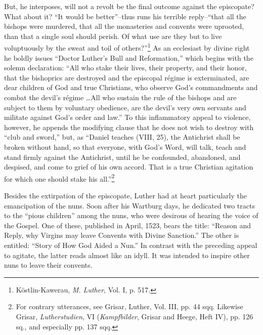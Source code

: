 But, he interposes, will not a revolt be the final outcome
against the episcopate? What about it? “It would be better”--thus runs his
terrible reply--“that all the bishops were murdered, that all the monasteries
and convents were uprooted, than that a single soul should perish. Of what
use are they but to live voluptuously by the sweat and toil of others?”\footnote
{Köstlin-Kawerau, \textit{M. Luther}, Vol. I, p. 517.}
As an ecclesiast by divine right he boldly issues “Doctor Luther’s Bull and
Reformation,” which begins with the solemn declaration: “All who stake
their lives, their property, and their honor, that the bishoprics are destroyed
and the episcopal régime is exterminated, are dear children of God and
true Christians, who observe God’s commandments and combat the devil’s
régime \dots All who sustain the rule of the bishops and are subject to
them by voluntary obedience, are the devil’s very own servants and militate
against God’s order and law.” To this inflammatory appeal to violence,
however, he appends the modifying clause that he does not wish to destroy
with “club and sword,” but, as “Daniel teaches (VIII, 25), the Antichrist
shall be broken without hand, so that everyone, with God’s Word, will talk,
teach and stand firmly against the Antichrist, until he be confounded,
abandoned, and despised, and come to grief of his own accord. That is a true
Christian agitation for which one should stake his all.”\footnote
{For contrary utterances, see Grisar, Luther, Vol. III, pp. 44 sqq. Likewise Grisar,
\textit{Lutherstudien}, VI (\textit{Kampfbilder}, Grisar and Heege, Heft IV), pp. 126 sq., and especially
pp. 137 sqq.}

Besides the extirpation of the episcopate, Luther had at heart
particularly the emancipation of the nuns. Soon after his Wartburg
days, he dedicated two tracts to the “pious children” among the
nuns, who were desirous of hearing the voice of the Gospel. One of
these, published in April, 1523, bears the title: “Reason and Reply,
why Virgins may leave Convents with Divine Sanction.” The other
is entitled: “Story of How God Aided a Nun.” In contrast with the
preceding appeal to agitate, the latter reads almost like an idyll. It
was intended to inspire other nuns to leave their convents.

